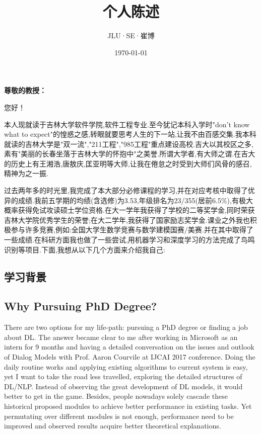 \documentclass[16pt，letterpaper]{ctexart}
\title{个人陈述}
\author{JLU·SE·崔博}
\date{\today}
\begin{document}
	\maketitle%
	\thispagestyle{empty}
	\vspace{12pt}
\noindent \textbf{尊敬的教授：}	
	
	您好！
	
	本人现就读于吉林大学软件学院,软件工程专业.至今犹记本科入学时"don't know what to expect"的惶惑之感,转眼就要思考人生的下一站,让我不由百感交集.我本科就读的吉林大学是"双一流","211工程","985工程"重点建设高校.吉大以其校区之多,素有"美丽的长春坐落于吉林大学的怀抱中"之美誉.所谓大学者,有大师之谓.在吉大的历史上有王湘浩,唐敖庆,匡亚明等大师,让我在倦怠之时受到大师们风骨的感召,精神为之一振.
	
	过去两年多的时光里,我完成了本大部分必修课程的学习,并在对应考核中取得了优异的成绩.我前五学期的均绩(含选修)为3.53,年级排名为23/355(居前6.5\%),有极大概率获得免试攻读硕士学位资格.在大一学年我获得了学校的二等奖学金,同时荣获吉林大学院优秀学生的荣誉;在大二学年,我获得了国家励志奖学金.课业之外我也积极参与许多竞赛,例如:全国大学生数学竞赛与数学建模国赛/美赛.并在其中取得了一些成绩.在科研方面我也做了一些尝试,用机器学习和深度学习的方法完成了鸟鸣识别等项目.下面,我想从以下几个方面来介绍我自己:
	\subsection{学习背景}
	
	
	\subsection{Why Pursuing PhD Degree?}
	There are two options for my life-path: pursuing a PhD degree or finding a job about DL. The answer became clear to me after working in Microsoft as an intern for 9 months and having a detailed conversation on the issues and outlook of Dialog Models with Prof. Aaron Courvile at IJCAI 2017 conference. Doing the daily routine works and applying existing algorithms to current system is easy, yet I want to take the road less travelled, exploring the detailed structures of DL/NLP. Instead of observing the great development of DL models, it would better to get in the game. Besides, people nowadays solely cascade these historical proposed modules to achieve better performance in existing tasks. Yet permutating over different modules is not enough, performance need to be improved and observed results acquire better theoretical explanations.
	
\end{document}
